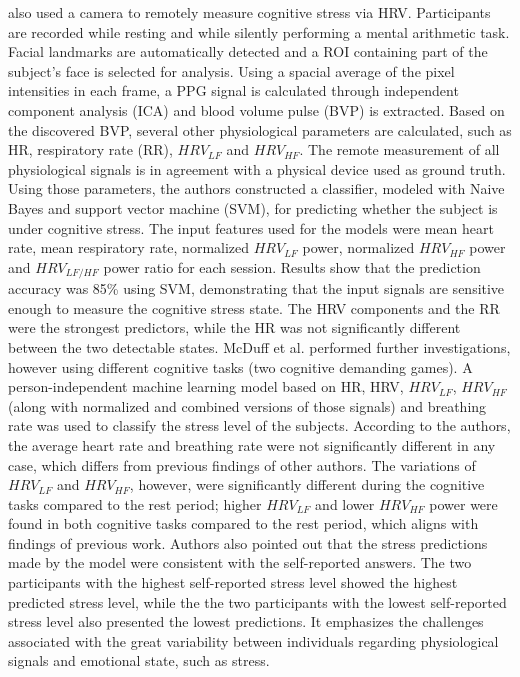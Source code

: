 \textcite{mcduff2014remote} also used a camera to remotely measure cognitive stress via HRV. Participants are recorded while resting and while silently performing a mental arithmetic task. Facial landmarks are automatically detected and a ROI containing part of the subject's face is selected for analysis. Using a spacial average of the pixel intensities in each frame, a PPG signal is calculated through independent component analysis (ICA) and blood volume pulse (BVP) is extracted. Based on the discovered BVP, several other physiological parameters are calculated, such as HR, respiratory rate (RR), $HRV_{LF}$ and $HRV_{HF}$. The remote measurement of all physiological signals is in agreement with a physical device used as ground truth. Using those parameters, the authors constructed a classifier, modeled with Naive Bayes and support vector machine (SVM), for predicting whether the subject is under cognitive stress. The input features used for the models were mean heart rate, mean respiratory rate, normalized $HRV_{LF}$ power, normalized $HRV_{HF}$ power and $HRV_{LF/HF}$ power ratio for each session. Results show that the prediction accuracy was 85\% using SVM, demonstrating that the input signals are sensitive enough to measure the cognitive stress state. The HRV components and the RR were the strongest predictors, while the HR was not significantly different between the two detectable states. McDuff et al. \parencite{mcduffcogcam} performed further investigations, however using different cognitive tasks (two cognitive demanding games). A person-independent machine learning model based on HR, HRV, $HRV_{LF}$, $HRV_{HF}$ (along with normalized and combined versions of those signals) and breathing rate was used to classify the stress level of the subjects. According to the authors, the average heart rate and breathing rate were not significantly different in any case, which differs from previous findings of other authors. The variations of $HRV_{LF}$ and $HRV_{HF}$, however, were significantly different during the cognitive tasks compared to the rest period; higher $HRV_{LF}$ and lower $HRV_{HF}$ power were found in both cognitive tasks compared to the rest period, which aligns with findings of previous work. Authors also pointed out that the stress predictions made by the model were consistent with the self-reported answers. The two participants with the highest self-reported stress level showed the highest predicted stress level, while the the two participants with the lowest self-reported stress level also presented the lowest predictions. It emphasizes the challenges associated with the great variability between individuals regarding physiological signals and emotional state, such as stress.


